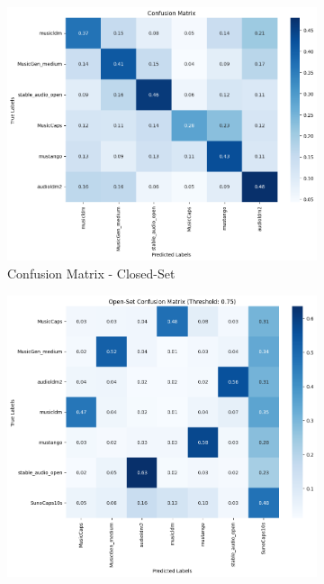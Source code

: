 \documentclass[conference]{IEEEtran}  %
\begin{document}
\begin{figure}
    \vspace{0.8em} %

    \begin{subfigure}[b]{0.32\textwidth}
        \centering
        \includegraphics[width=1.11\linewidth]{Figures/ConfusionMatrixClosedSet.png}
        \caption{Confusion Matrix - Closed-Set}
        \label{fig: Closed-Set}
    \end{subfigure}%
    \hfill
    \begin{subfigure}[b]{0.32\textwidth}
        \centering
        \includegraphics[width=\linewidth]{Figures/ConfusionMatrixOpenSetThreshold.PNG} %

\end{subfigure}
\end{figure}
\end{document}
